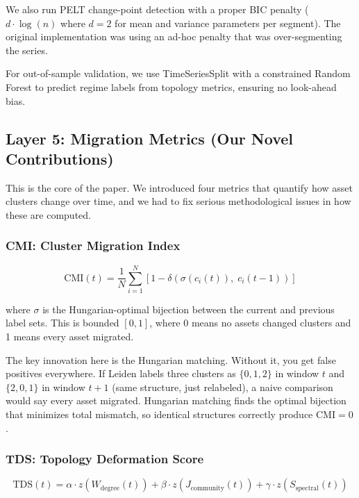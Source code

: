 \documentclass[12pt, letterpaper]{article}
\begin{document}
We also run PELT change-point detection with a proper BIC penalty ($d \cdot \log(n)$ where $d=2$ for mean and variance parameters per segment). The original implementation was using an ad-hoc penalty that was over-segmenting the series.

For out-of-sample validation, we use TimeSeriesSplit with a constrained Random Forest to predict regime labels from topology metrics, ensuring no look-ahead bias.

\subsection{Layer 5: Migration Metrics (Our Novel Contributions)}

This is the core of the paper. We introduced four metrics that quantify how asset clusters change over time, and we had to fix serious methodological issues in how these are computed.

\subsubsection{CMI: Cluster Migration Index}

\begin{equation}
    \text{CMI}(t) = \frac{1}{N} \sum_{i=1}^{N} \left[ 1 - \delta\!\left(\sigma\!\left(c_i(t)\right),\; c_i(t-1)\right) \right]
\end{equation}

where $\sigma$ is the Hungarian-optimal bijection between the current and previous label sets. This is bounded $[0,1]$, where 0 means no assets changed clusters and 1 means every asset migrated.

The key innovation here is the Hungarian matching. Without it, you get false positives everywhere. If Leiden labels three clusters as $\{0, 1, 2\}$ in window $t$ and $\{2, 0, 1\}$ in window $t+1$ (same structure, just relabeled), a naive comparison would say every asset migrated. Hungarian matching finds the optimal bijection that minimizes total mismatch, so identical structures correctly produce $\text{CMI}=0$.

\subsubsection{TDS: Topology Deformation Score}

\begin{equation}
    \text{TDS}(t) = \alpha \cdot z\!\left(W_{\text{degree}}(t)\right) + \beta \cdot z\!\left(J_{\text{community}}(t)\right) + \gamma \cdot z\!\left(S_{\text{spectral}}(t)\right)
\end{equation}
\end{document}
